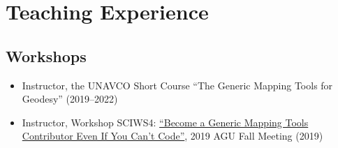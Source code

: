\section{Teaching Experience}

\subsection{Workshops}
\begin{itemize}
\item Instructor, the UNAVCO Short Course ``The Generic Mapping Tools for Geodesy'' (2019--2022)
\item Instructor, Workshop SCIWS4: \href{https://www.agu.org/Events/SCIWS4-Generic-Mapping-Tools}{``Become a Generic Mapping Tools Contributor Even If You Can't Code''}, 2019 AGU Fall Meeting (2019)
\end{itemize}
